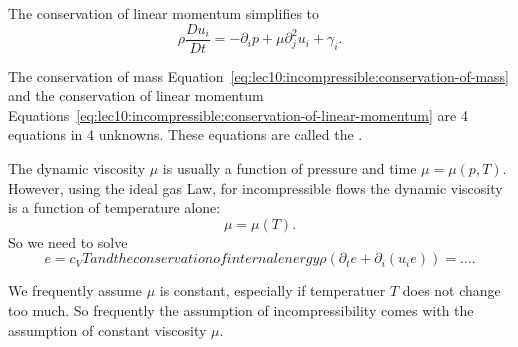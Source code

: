 \begin{node}
The conservation of linear momentum simplifies to
\begin{equation*}\label{eq:lec10:incompressible:conservation-of-linear-momentum}
\rho\frac{D u_{i}}{D t}=-\partial_{i}p+\mu\partial_{j}^{2}u_{i}+\gamma_{i}.
\end{equation*}
\end{node}

\begin{definition}
The conservation of mass
Equation~\eqref{eq:lec10:incompressible:conservation-of-mass} and the
conservation of linear momentum Equations~\eqref{eq:lec10:incompressible:conservation-of-linear-momentum}
are 4 equations in 4 unknowns. These equations are called the
.
\end{definition}

\begin{node}
The dynamic viscosity $\mu$ is usually a function of pressure and time
$\mu=\mu(p,T)$. However, using the ideal gas Law, for incompressible
flows the dynamic viscosity is a function of temperature alone:
\begin{equation}
\mu=\mu(T).
\end{equation}
So we need to solve
\begin{subequations}
\begin{equation}
e=c_{V}T
\end{equation}
and the conservation of internal energy
\begin{equation}
\rho(\partial_{t}e+\partial_{i}(u_{i}e))=\dots.
\end{equation}
\end{subequations}
\end{node}

\begin{node}
We frequently assume $\mu$ is constant, especially if temperatuer $T$
does not change too much. So frequently the assumption of
incompressibility comes with the assumption of constant viscosity $\mu$.
\end{node}

